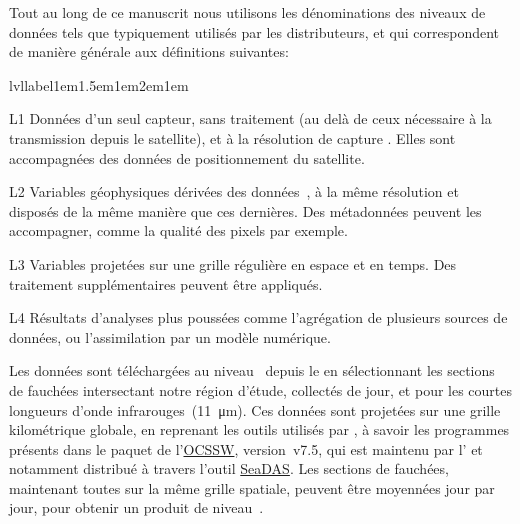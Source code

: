 \begin{note}[label={note:data-levels}, breakable]
  Tout au long de ce manuscrit nous utilisons les dénominations des niveaux de données tels que typiquement utilisés par les distributeurs, et qui correspondent de manière générale aux définitions suivantes:
  \newcommand*\lvllabel[1]{\hspace\labelsep \normalfont\bfseries\lfstyle #1}%
  \begin{flexlabelled}{lvllabel}{1em}{1.5em}{1em}{2em}{1em}
    \item[L1] Données d'un seul capteur, sans traitement (au delà de ceux nécessaire à la transmission depuis le satellite), et à la résolution de capture .
    Elles sont accompagnées des données de positionnement du satellite.

    \item[L2] Variables géophysiques dérivées des données~, à la même résolution et disposés de la même manière que ces dernières.
    Des métadonnées peuvent les accompagner, comme la qualité des pixels par exemple.

    \item[L3] Variables projetées sur une grille régulière en espace et en temps.
    Des traitement supplémentaires peuvent être appliqués.

    \item[L4] Résultats d'analyses plus poussées comme l’agrégation de plusieurs sources de données, ou l'assimilation par un modèle numérique.
  \end{flexlabelled}
\end{note}

Les données sont téléchargées au niveau~ depuis le  en sélectionnant les sections de fauchées\footnotemark{} intersectant notre région d'étude, collectés de jour, et pour les courtes longueurs d'onde infrarouges~(\qty{11}{\um}).
Ces données sont projetées sur une grille kilométrique globale, en reprenant les outils utilisés par \citeauthor{liu_2016}, à savoir les programmes présents dans le paquet de l'\href{https://oceandata.sci.gsfc.nasa.gov/ocssw}{OCSSW}, version~v7.5, qui est maintenu par l' et notamment distribué à travers l'outil \href{https://seadas.gsfc.nasa.gov/}{SeaDAS}.
Les sections de fauchées, maintenant toutes sur la même grille spatiale, peuvent être moyennées jour par jour, pour obtenir un produit de niveau~.

